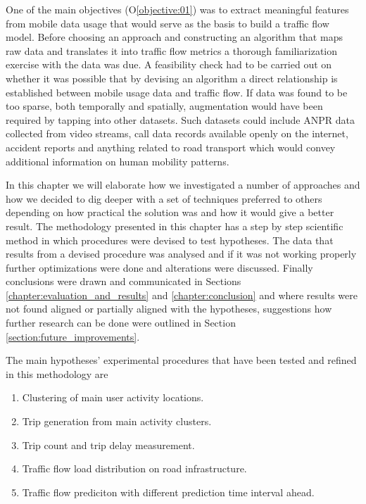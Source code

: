 \documentclass[12pt, a4paper]{report}
\theoremstyle{definition}
\theoremstyle{definition}%
\theoremstyle{definition}%
\theoremstyle{definition}%
\theoremstyle{definition}%
\theoremstyle{definition}%
\begin{document}
One of the main objectives (O\ref{objective:01}) was to extract meaningful features from mobile data usage that would serve as the basis to build a traffic flow model. Before choosing an approach and constructing an algorithm that maps raw data and translates it into traffic flow metrics a thorough familiarization exercise with the data was due. A feasibility check had to be carried out on whether it was possible that by devising an algorithm a direct relationship is established between mobile usage data and traffic flow. If data was found to be too sparse, both temporally and spatially,  augmentation would have been required by tapping into other datasets. Such  datasets could include ANPR data collected from video streams, call data records available openly on the internet, accident reports and anything related to road transport which would convey additional information on human mobility patterns. 

In this chapter we will elaborate how we investigated a number of approaches and how we decided to dig deeper with a set of techniques preferred to others depending on how practical the solution was and how it would give a better result. The methodology presented in this chapter has a step by step scientific method in which procedures were devised to test hypotheses. The data that results from a devised procedure was analysed and if it was not working properly further optimizations were done and alterations were discussed. Finally conclusions were drawn and communicated in Sections \ref{chapter:evaluation_and_results} and \ref{chapter:conclusion}  and where results were not found aligned or partially aligned with the hypotheses, suggestions how further research can be done were outlined in Section \ref{section:future_improvements}. 

The main hypotheses' experimental procedures that have been tested and refined in this methodology are 

\begin{enumerate}
	
	\item Clustering of main user activity locations. 
	\item Trip generation from main activity clusters.
	\item Trip count and trip delay measurement.
	\item Traffic flow load distribution on road infrastructure. 
	\item Traffic flow prediciton with different prediction time interval ahead.
	
\end{enumerate}
\end{document}
